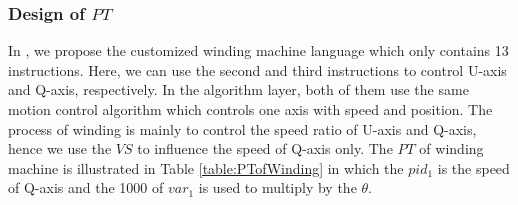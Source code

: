 \documentclass[journal,UTF8]{IEEEtran}
\begin{document}
\subsubsection{Design of $PT$}
In \cite{wu2018customized}, we propose the customized winding machine language which only contains 13 instructions. Here, we can use the second and third instructions to control U-axis and Q-axis, respectively. In the algorithm layer, both of them use the same motion control algorithm which controls one axis with speed and position. The process of winding is mainly to control the speed ratio of U-axis and Q-axis, hence we use the $VS$ to influence the speed of Q-axis only. The $PT$ of winding machine is illustrated in Table \ref{table:PTofWinding} in which the $pid_1$ is the speed of Q-axis and the 1000 of $var_1$ is used to multiply by the $\theta$.
\end{document}
